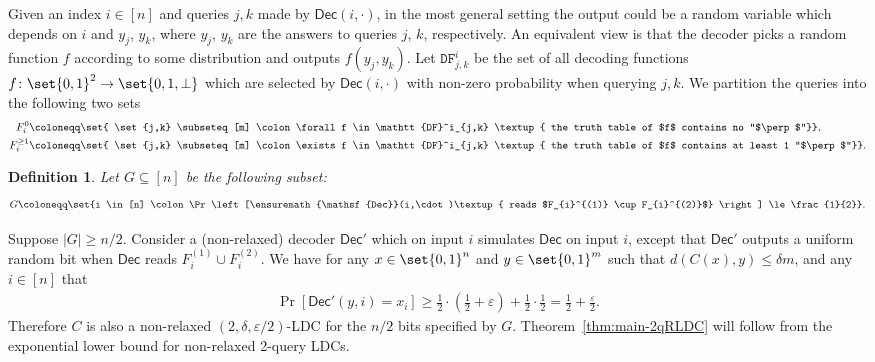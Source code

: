 \documentclass[10pt,a4paper]{article}
\newtheorem{definition}{Definition}
\theoremstyle{remark}
\newcommand{\tuple}[1]{\ensuremath{\left(#1\right)}}
\newcommand{\tp}{\tuple}
\newcommand{\eps}{\ensuremath{\varepsilon}}
\newcommand{\itn}[1]{^{(#1)}}
\newcommand{\Dec}{\ensuremath{\mathsf{Dec}}\xspace}
\newcommand{\authnote}[3]{\textcolor{#2}{{\sf (#1's Note: {\sl{#3}})}}}
\newcommand{\xnote}{\authnote{Xin}{magenta}}
\newcommand{\authnote}{}
\newcommand{\xnote}[1]{}
\begin{document}
Given an index $i \in [n]$ and queries $j,k$ made by $\Dec(i,\cdot)$, in the most general setting the output could be a random variable which depends on $i$ and $y_j$, $y_k$, where $y_j$, $y_k$ are the answers to queries $j$, $k$, respectively. An equivalent view is that the decoder picks a random function $f$ according to some distribution and outputs $f(y_j, y_k)$. Let $\mathtt{DF}^i_{j,k}$ be the set of all decoding functions $f \colon \set{0,1}^2 \rightarrow \set{0,1,\perp}$ which are selected by $\Dec(i,\cdot)$ with non-zero probability when querying $j,k$. We partition the queries into the following two sets
\begin{align*}
F_{i}^{0} &\coloneqq \set{ \set{j,k} \subseteq [m] \colon \forall f \in \mathtt{DF}^i_{j,k} \textup{ the truth table of $f$ contains no ``$\perp$''}}, \\
F_{i}^{\ge 1} &\coloneqq \set{ \set{j,k} \subseteq [m] \colon \exists f \in \mathtt{DF}^i_{j,k} \textup{ the truth table of $f$ contains at least 1 ``$\perp$''}}.
\end{align*}

\iffalse
\begin{definition}
	Let $G \subseteq [n]$ be the following subset:
	\begin{align*}
	G \coloneqq \set{i \in [n] \colon \Pr\left[\Dec(i,\cdot)\textup{ reads $F_{i}\itn{1} \cup F_{i}\itn{2}$} \right] \le \frac{1}{2}}.
	\end{align*}
\end{definition}

Suppose $|G| \ge n/2$. Consider a (non-relaxed) decoder $\Dec'$ which on input $i$ simulates $\Dec$ on input $i$, except that $\Dec'$ outputs a uniform random bit when $\Dec$ reads $F_{i}\itn{1} \cup F_{i}\itn{2}$. We have for any $x \in \set{0,1}^n$ and $y \in \set{0,1}^m$ such that $d(C(x), y) \le \delta m$, and any $i \in [n]$ that 
\begin{align*}
\Pr\left[ \Dec'(y, i) = x_i \right] \ge \frac{1}{2} \cdot \tp{\frac{1}{2} + \eps} + \frac{1}{2} \cdot \frac{1}{2} = \frac{1}{2} + \frac{\eps}{2}.
\end{align*}
Therefore $C$ is also a non-relaxed $(2,\delta,\eps/2)$-LDC for the $n/2$ bits specified by $G$. Theorem~\ref{thm:main-2qRLDC} will follow from the exponential lower bound for non-relaxed 2-query LDCs.
\end{document}
